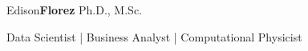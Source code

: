 \begin{center}
    {\fontsize{50}{40}\selectfont Edison\textbf{Florez}}
    \hspace*{5mm}
    {\fontsize{20}{40}\selectfont Ph.D., M.Sc.}

    \vspace*{3mm}
    \Large{
        Data Scientist | Business Analyst | Computational Physicist
    }
\end{center}
